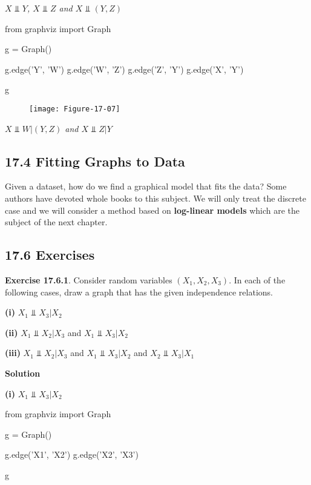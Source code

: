 \emph{\(X \text{ ⫫ } Y\), \(X \text{ ⫫ } Z\) and
\(X \text{ ⫫ } (Y, Z)\)}

\begin{python}
from graphviz import Graph

g = Graph()

g.edge('Y', 'W')
g.edge('W', 'Z')
g.edge('Z', 'Y')
g.edge('X', 'Y')

g
\end{python}

 
\begin{figure}[H]
\centering
\texttt{[image: Figure-17-07]}
\end{figure}

\emph{\(X \text{ ⫫ } W | (Y, Z)\) and \(X \text{ ⫫ } Z | Y\)}

\subsection*{17.4 Fitting Graphs to Data}\label{fitting-graphs-to-data}

Given a dataset, how do we find a graphical model that fits the data?
Some authors have devoted whole books to this subject. We will only
treat the discrete case and we will consider a method based on
\textbf{log-linear models} which are the subject of the next chapter.

\subsection*{17.6 Exercises}

\textbf{Exercise 17.6.1}. Consider random variables \((X_{1}, X_{2}, X_{3})\).
In each of the following cases, draw a graph that has the given
independence relations.

\textbf{(i)} \(X_{1} \text{ ⫫ } X_{3} | X_{2}\)

\textbf{(ii)} \(X_{1} \text{ ⫫ } X_{2} | X_{3}\) and
\(X_{1} \text{ ⫫ } X_{3} | X_{2}\)

\textbf{(iii)} \(X_{1} \text{ ⫫ } X_{2} | X_{3}\) and
\(X_{1} \text{ ⫫ } X_{3} | X_{2}\) and \(X_{2} \text{ ⫫ } X_{3} | X_{1}\)

\textbf{Solution}

\textbf{(i)} \(X_{1} \text{ ⫫ } X_{3} | X_{2}\)

\begin{python}
from graphviz import Graph

g = Graph()

g.edge('X1', 'X2')
g.edge('X2', 'X3')

g
\end{python}

